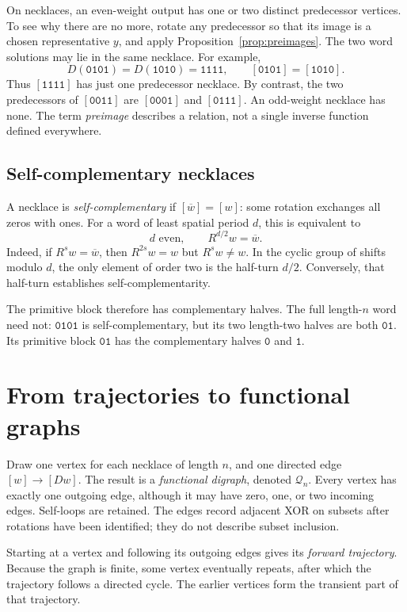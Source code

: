 \documentclass[11pt]{article}
\theoremstyle{definition}
\newcommand{\neck}[1]{[\mathtt{#1}]}
\newcommand{\word}[1]{\mathtt{#1}}
\numberwithin{equation}{section}
\begin{document}
On necklaces, an even-weight output has one or two distinct predecessor
vertices. To see why there are no more, rotate any predecessor so that
its image is a chosen representative $y$, and apply
Proposition~\ref{prop:preimages}. The two word solutions may lie in
the same necklace. For example,
\[
 D(\word{0101})=D(\word{1010})=\word{1111},
 \qquad\neck{0101}=\neck{1010}.
\]
Thus $\neck{1111}$ has just one predecessor necklace.
By contrast, the two predecessors of $\neck{0011}$ are
$\neck{0001}$ and $\neck{0111}$. An odd-weight necklace has none.
The term \emph{preimage} describes a relation, not a single inverse
function defined everywhere.

\subsection{Self-complementary necklaces}

A necklace is \emph{self-complementary} if $[\overline w]=[w]$:
some rotation exchanges all zeros with ones. For a word of least
spatial period $d$, this is equivalent to
\begin{equation}\label{eq:self-complement}
 d\text{ even},\qquad R^{d/2}w=\overline w.
\end{equation}
Indeed, if $R^sw=\overline w$, then $R^{2s}w=w$ but $R^sw\ne w$.
In the cyclic group of shifts modulo $d$, the only element of order
two is the half-turn $d/2$. Conversely, that half-turn establishes
self-complementarity.

The primitive block therefore has complementary halves. The full
length-$n$ word need not: $\word{0101}$ is self-complementary, but
its two length-two halves are both $\word{01}$. Its primitive block
$\word{01}$ has the complementary halves $\word{0}$ and $\word{1}$.

\section{From trajectories to functional graphs}\label{sec:graphs}

Draw one vertex for each necklace of length $n$, and one directed edge
$[w]\to[Dw]$. The result is a \emph{functional digraph}, denoted
$\mathcal Q_n$. Every vertex has exactly one outgoing edge, although
it may have zero, one, or two incoming edges. Self-loops are retained.
The edges record adjacent XOR on subsets after rotations have been
identified; they do not describe subset inclusion.

Starting at a vertex and following its outgoing edges gives its
\emph{forward trajectory}. Because the graph is finite, some vertex
eventually repeats, after which the trajectory follows a directed cycle.
The earlier vertices form the transient part of that trajectory.
\end{document}
